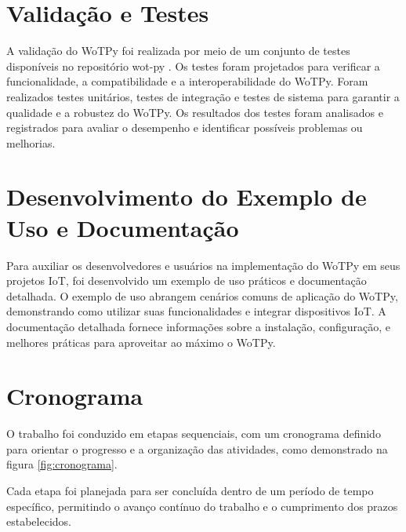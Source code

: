\section{Validação e Testes}

A validação do WoTPy foi realizada por meio de um conjunto de testes disponíveis no repositório wot-py . Os testes foram projetados para verificar a funcionalidade, a compatibilidade e a interoperabilidade do WoTPy. Foram realizados testes unitários, testes de integração e testes de sistema para garantir a qualidade e a robustez do WoTPy. Os resultados dos testes foram analisados e registrados para avaliar o desempenho e identificar possíveis problemas ou melhorias.

\section{Desenvolvimento do Exemplo de Uso e Documentação}

Para auxiliar os desenvolvedores e usuários na implementação do WoTPy em seus projetos IoT, foi desenvolvido um exemplo de uso práticos e documentação detalhada. O exemplo de uso abrangem cenários comuns de aplicação do WoTPy, demonstrando como utilizar suas funcionalidades e integrar dispositivos IoT. A documentação detalhada fornece informações sobre a instalação, configuração, e melhores práticas para aproveitar ao máximo o WoTPy. 

\section{Cronograma}

O trabalho foi conduzido em etapas sequenciais, com um cronograma definido para orientar o progresso e a organização das atividades, como demonstrado na figura \ref{fig:cronograma}.

Cada etapa foi planejada para ser concluída dentro de um período de tempo específico, permitindo o avanço contínuo do trabalho e o cumprimento dos prazos estabelecidos.

%
%

